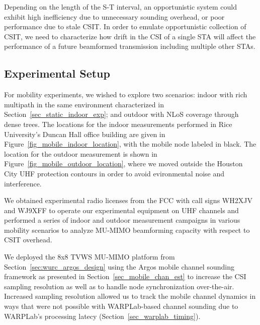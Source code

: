 	Depending on the length of the S-T interval, an opportunistic system could exhibit high inefficiency due to unnecessary sounding overhead, or poor performance due to stale \ac{CSIT}.
	In order to emulate opportunistic collection of \ac{CSIT}, we need to characterize how drift in the \ac{CSI} of a single \ac{STA} will affect the performance of a future beamformed transmission including multiple other \acp{STA}.

\subsection{Experimental Setup}
\label{sec_uhf_mobile_setup}

	For mobility experiments, we wished to explore two scenarios: indoor with rich multipath in the same environment characterized in Section~\ref{sec_static_indoor_exp}; and outdoor with \ac{NLoS} coverage through dense trees.
	The locations for the indoor measurements performed in Rice University's Duncan Hall office building are given in Figure~\ref{fig_mobile_indoor_location}, with the mobile node labeled in black.
	The location for the outdoor measurement is shown in Figure~\ref{fig_mobile_outdoor_location}, where we moved outside the Houston City UHF protection contours in order to avoid evironmental noise and interference.

	We obtained experimental radio licenses from the \ac{FCC} with call signs WH2XJV and WJ9XFF to operate our experimental equipment on UHF channels and performed a series of indoor and outdoor measurement campaigns in various mobility scenarios to analyze \ac{MU-MIMO} beamforming capacity with respect to \ac{CSIT} overhead.

	We deployed the 8x8 \ac{TVWS} \ac{MU-MIMO} platform from Section~\ref{sec:wurc_argos_design} using the Argos mobile channel sounding framework as presented in Section~\ref{sec_mobile_chan_est} to increase the \ac{CSI} sampling resolution as well as to handle node synchronization over-the-air.
	Increased sampling resolution allowed us to track the mobile channel dynamics in ways that were not possible with WARPLab-based channel sounding due to WARPLab's processing latecy (Section~\ref{sec_warplab_timing}).
	
